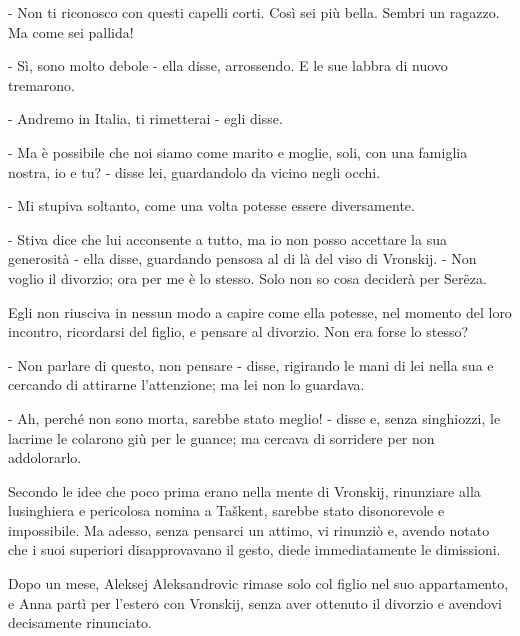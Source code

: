 - Non ti riconosco con questi capelli corti. Così sei più bella. Sembri un ragazzo. Ma come sei pallida! 

- Sì, sono molto debole - ella disse, arrossendo. E le sue labbra di nuovo tremarono. 

- Andremo in Italia, ti rimetterai - egli disse. 

- Ma è possibile che noi siamo come marito e moglie, soli, con una famiglia nostra, io e tu? - disse lei, guardandolo da vicino negli occhi. 

- Mi stupiva soltanto, come una volta potesse essere diversamente. 

- Stiva dice che lui acconsente a tutto, ma io non posso accettare la sua generosità - ella disse, guardando pensosa al di là del viso di Vronskij. - Non voglio il divorzio; ora per me è lo stesso. Solo non so cosa deciderà per Serëza. 

Egli non riusciva in nessun modo a capire come ella potesse, nel momento del loro incontro, ricordarsi del figlio, e pensare al divorzio. Non era forse lo stesso? 

- Non parlare di questo, non pensare - disse, rigirando le mani di lei nella sua e cercando di attirarne l'attenzione; ma lei non lo guardava. 

- Ah, perché non sono morta, sarebbe stato meglio! - disse e, senza singhiozzi, le lacrime le colarono giù per le guance; ma cercava di sorridere per non addolorarlo. 

Secondo le idee che poco prima erano nella mente di Vronskij, rinunziare alla lusinghiera e pericolosa nomina a Taškent, sarebbe stato disonorevole e impossibile. Ma adesso, senza pensarci un attimo, vi rinunziò e, avendo notato che i suoi superiori disapprovavano il gesto, diede immediatamente le dimissioni. 

Dopo un mese, Aleksej Aleksandrovic rimase solo col figlio nel suo appartamento, e Anna partì per l'estero con Vronskij, senza aver ottenuto il divorzio e avendovi decisamente rinunciato. 
